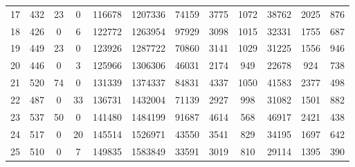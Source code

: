 \begin{table*}[!hbt]
\begin{center}
\begin{tabular}{l| c c c c c c c c c c c }
                  17 &   432 &       23 &        0 &     116678 & 1207336 &            74159 &     3775 &                               1072 &        38762 &        2025 &         876   \\                                                                     
                  18 &   426 &        0 &        6 &     122772 & 1263954 &            97929 &     3098 &                               1015 &        32331 &        1755 &         687   \\                                                                     
                  19 &   449 &       23 &        0 &     123926 & 1287722 &            70860 &     3141 &                               1029 &        31225 &        1556 &         946   \\                                                                     
                  20 &   446 &        0 &        3 &     125966 & 1306306 &            46031 &     2174 &                                949 &        22678 &         924 &         738   \\                                                                     
                  21 &   520 &       74 &        0 &     131339 & 1374337 &            84831 &     4337 &                               1050 &        41583 &        2377 &         498   \\                                                                     
                  22 &   487 &        0 &       33 &     136731 & 1432004 &            71139 &     2927 &                                998 &        31082 &        1501 &         882   \\                                                                     
                  23 &   537 &       50 &        0 &     141480 & 1484199 &            91687 &     4614 &                                568 &        46917 &        2421 &         438   \\                                                                     
                  24 &   517 &        0 &       20 &     145514 & 1526971 &            43550 &     3541 &                                829 &        34195 &        1697 &         642   \\                                                                     
                  25 &   510 &        0 &        7 &     149835 & 1583849 &            33591 &     3019 &                                810 &        29114 &        1395 &         390   \\ \bottomrule                                                                    
            \end{tabular}
      \end{center}
\end{table*}
